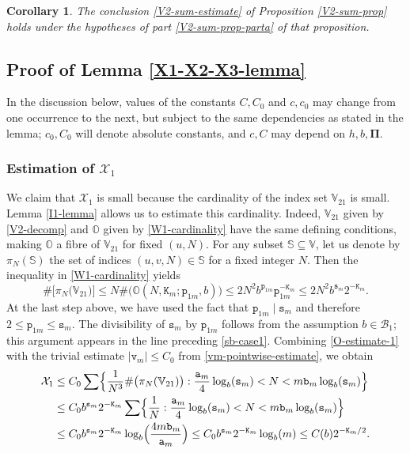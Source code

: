 \documentclass[12pt, twoside]{article}
\newtheorem{corollary}[theorem]{Corollary}
\theoremstyle{definition}
\numberwithin{equation}{section}
\begin{document}
\begin{corollary} \label{V2-sum-corollary-parta} 
The conclusion \eqref{V2-sum-estimate} of Proposition \ref{V2-sum-prop} holds under the hypotheses of part \eqref{V2-sum-prop-parta} of that proposition. 
\end{corollary}
\subsection{Proof of Lemma \ref{X1-X2-X3-lemma}}  
In the discussion below, values of the constants $C, C_0$ and $c, c_0$ may change from one occurrence to the next, but subject to the same dependencies as stated in the lemma; $c_0, C_0$ will denote absolute constants, and $c, C$ may depend on $h, b, \pmb{\Pi}$.
\subsubsection{Estimation of $\mathcal X_1$} \label{X1-estimation-section}
We claim that $\mathcal X_1$ is small because the cardinality of the index set $\mathbb V_{21}$ is small. Lemma \ref{I1-lemma} allows us to estimate this cardinality. Indeed, $\mathbb V_{21}$ given by \eqref{V2-decomp} and $\mathbb O$ given by \eqref{W1-cardinality} have the same defining conditions, making $\mathbb O$ a fibre of $\mathbb V_{21}$ for fixed $(u, N)$. For any subset $\mathbb S \subseteq \mathbb V$, let us denote by $\pi_N(\mathbb S)$ the set of indices $(u, v, N) \in \mathbb S$ for a fixed integer $N$. Then the inequality in \eqref{W1-cardinality} yields
\begin{equation} \label{O-estimate-1}
\# \bigl[ \pi_N \bigl(\mathbb V_{21} \bigr) \bigr] \leq  N \# \bigl(\mathbb O(N, \mathtt K_m; \mathtt p_{1m}, b) \bigr) \leq 2N^2 b^{\mathtt p_{1m}} \mathtt p_{1m}^{-\mathtt K_m} \leq 2N^2 b^{\mathtt s_m} 2^{-\mathtt K_m}.
\end{equation} 
At the last step above, we have used the fact that $\mathtt p_{1m} \mid \mathtt s_m$ and therefore $2 \leq \mathtt p_{1m} \leq \mathtt s_m$. The divisibility of $\mathtt s_m$ by $\mathtt p_{1m}$ follows from the assumption $b\in \mathscr{B}_1$; this argument appears in the line preceding \eqref{sb-case1}. Combining \eqref{O-estimate-1} with the trivial estimate $|\mathtt v_m| \leq C_0$ from \eqref{vm-pointwise-estimate}, we obtain 
\begin{align} 
\mathcal X_1 &\leq C_0 \sum \Bigl\{\frac{1}{N^3} \#\bigl( \pi_N(\mathbb V_{21}) \bigr) : \frac{\mathtt a_m}{4} \log_b (\mathtt s_m) < N < m \mathtt b_m  \log_b (\mathtt s_m)\Bigr\} \nonumber \\ 
&\leq C_0 b^{\mathtt s_m} 2^{-\mathtt K_m} \sum \Bigl\{\frac{1}{N} : \frac{\mathtt a_m}{4} \log_b (\mathtt s_m) < N < m \mathtt b_m \log_b (\mathtt s_m)\Bigr\} \nonumber \\
&\leq C_0 b^{\mathtt s_m} 2^{-\mathtt K_m} \log_b \Bigl(\frac{4m \mathtt b_m}{\mathtt a_m}\Bigr) \leq C_0  b^{\mathtt s_m} 2^{-\mathtt K_m} \log_b (m) \leq C(b) 2^{-\mathtt K_m/2}. \label{X1-bound} 
\end{align} 
\end{document}
